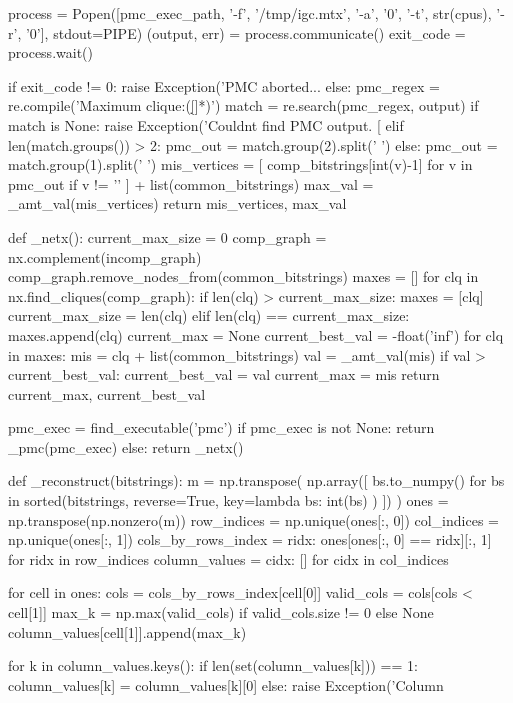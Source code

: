 \documentclass[a4paper, 12pt]{book}
\begin{document}
\begin{python}
      process = Popen([pmc_exec_path, '-f', '/tmp/igc.mtx', '-a', '0', '-t', str(cpus), '-r', '0'], stdout=PIPE)
      (output, err) = process.communicate()
      exit_code = process.wait()

      if exit_code != 0:
        raise Exception('PMC aborted... %
      else:
       pmc_regex = re.compile('Maximum clique:\s([\d\s]*)')
       match = re.search(pmc_regex, output)
        if match is None:
          raise Exception('Couldnt find PMC output. [%
        elif len(match.groups()) > 2:
          pmc_out = match.group(2).split(' ')
        else:
          pmc_out = match.group(1).split(' ')
        mis_vertices = [
          comp_bitstrings[int(v)-1] for v in pmc_out 
          if v != '\n'
        ] + list(common_bitstrings)
        max_val = _amt_val(mis_vertices)
      return mis_vertices, max_val

    def _netx():
      current_max_size = 0
      comp_graph = nx.complement(incomp_graph)
      comp_graph.remove_nodes_from(common_bitstrings)
      maxes = []
      for clq in nx.find_cliques(comp_graph):
        if len(clq) > current_max_size:
          maxes = [clq]
          current_max_size = len(clq)
        elif len(clq) == current_max_size:
          maxes.append(clq)
      current_max = None
      current_best_val = -float('inf')
      for clq in maxes:
        mis = clq + list(common_bitstrings)
        val = _amt_val(mis)
        if val > current_best_val:
          current_best_val = val
          current_max = mis
      return current_max, current_best_val

    pmc_exec = find_executable('pmc')
    if pmc_exec is not None:
      return _pmc(pmc_exec)
    else:
      return _netx()

  def _reconstruct(bitstrings):
    m = np.transpose(
      np.array([
        bs.to_numpy() for bs 
        in sorted(bitstrings, 
          reverse=True, 
          key=lambda bs: int(bs)
        )
      ])
    )
    ones = np.transpose(np.nonzero(m))
    row_indices = np.unique(ones[:, 0])
    col_indices = np.unique(ones[:, 1])
    cols_by_rows_index = {
      ridx: ones[ones[:, 0] == ridx][:, 1] 
      for ridx in row_indices
    }
    column_values = {cidx: [] for cidx in col_indices}

    for cell in ones:
      cols = cols_by_rows_index[cell[0]]
      valid_cols = cols[cols < cell[1]]
      max_k = np.max(valid_cols) if valid_cols.size != 0 else None
      column_values[cell[1]].append(max_k)

    for k in column_values.keys():
      if len(set(column_values[k])) == 1:
        column_values[k] = column_values[k][0]
      else:
        raise Exception('Column %


\end{python}
\end{document}
